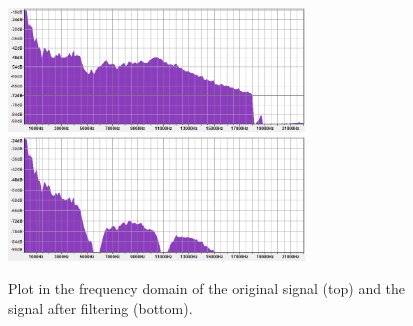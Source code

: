 \begin{figure}
\begin{center}
\includegraphics[width=0.7\textwidth]{images/spectrum_input.png}
\includegraphics[width=0.7\textwidth]{images/spectrum_output.png}
\caption{Plot in the frequency domain of the original signal (top) and the signal after filtering (bottom).}
\label{fig:spectrum}
\end{center}
\end{figure}


\FloatBarrier
